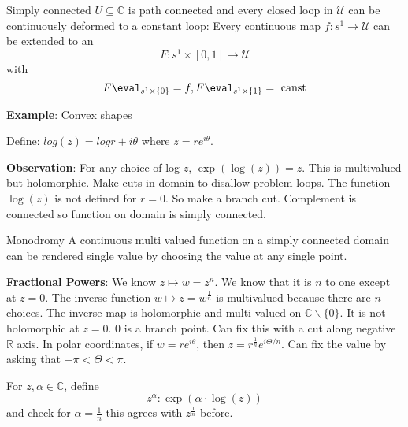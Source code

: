 \documentclass{report}
\begin{document}
\begin{definition}{Simply connected}
    $U \subseteq \mathbb{C}$ is path connected and every closed loop in $\mathcal{U}$ can be continuously deformed to a constant loop: Every continuous map $f : s^{1} \rightarrow \mathcal{U}$ can be extended to an 
        \begin{equation*}
            F : s^{1} \times [0, 1] \rightarrow \mathcal{U}
        \end{equation*}
    with 
        \begin{equation*}
            F \eval_{s^{1} \times \{0\}} = f, F \eval_{s^{1} \times \{1\}} = \text{ canst}
        \end{equation*}
\end{definition}

\textbf{Example}: Convex shapes

Define: $log(z) = log r + i\theta$ where $z = re^{i \theta}$. 

\textbf{Observation}: For any choice of log $z$, $\exp(\mathop{log}(z)) = z$. This is multivalued but holomorphic. Make cuts in domain to disallow problem loops. The function $\mathop{log}(z)$ is not defined for $r = 0$. So make a branch cut. Complement is connected so function on domain is simply connected.

\begin{theorem}{Monodromy}
    A continuous multi valued function on a simply connected domain can be rendered single value by choosing the value at any single point.
\end{theorem}

\textbf{Fractional Powers}: We know $z \mapsto w = z^{n}$. We know that it is $n$ to one except at $z = 0$. The inverse function $w \mapsto z = w^{\frac{1}{n}}$ is multivalued because there are $n$ choices. The inverse map is holomorphic and multi-valued on $\mathbb{C} \backslash \{0\}$. It is not holomorphic at $z = 0$. $0$ is a branch point. Can fix this with a cut along negative $\mathbb{R}$ axis. In polar coordinates, if $w = re^{i\theta}$, then $z = r^{\frac{1}{n}}e^{i\Theta/n}$. Can fix the value by asking that $-\pi < \Theta < \pi$. 

\begin{definition}{}
    For $z, \alpha \in \mathbb{C}$, define 
        \begin{equation*}
            z^{\alpha} : \exp(\alpha \cdot \mathop{log}(z))
        \end{equation*}
    and check for $\alpha = \frac{1}{n}$ this agrees with $z^{\frac{1}{n}}$ before.
\end{definition}
\end{document}
